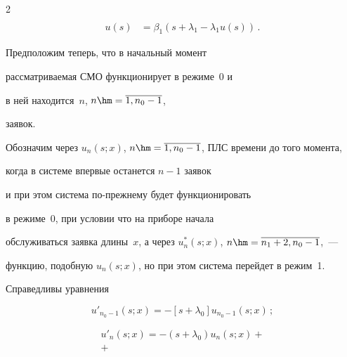 \begin{multicols}{2}
\begin{align*}
\\


u(s) &= \beta_1(s + \lambda_1 - \lambda_1 u(s))\,.


\end{align*}







Предположим теперь, что в начальный момент


рассматриваемая СМО функционирует в режиме~0 и


в ней находится~$n$, $n\hm=\overline{1,n_0-1}$,


заявок.


Обозначим через $u_n(s;x)$, $n\hm=\overline{1,n_0-1}$, ПЛС времени до того момента,


когда в системе впервые останется $n-1$ заявок


и при этом система по-преж\-не\-му будет функционировать


в режиме~0, при условии что на приборе начала


обслуживаться заявка длины~$x$, а через $u^*_n(s;x)$, $n\hm=\overline{n_1+2,n_0-1}$,~--- 


функцию, подобную $u_n(s;x)$, но при этом система перейдет в режим~1.





Справедливы уравнения




\begin{equation}


\label{5-1-m}


u'_{n_0-1}(s;x) = - \left[s + \lambda_0\right] u_{n_0-1}(s;x)\,;


\end{equation}







\vspace*{-12pt}





\noindent


\begin{multline*}


u'_n(s;x) = - (s + \lambda_0) u_{n}(s;x) +{}


\\


{}+



\end{multline*}
\end{multicols}
